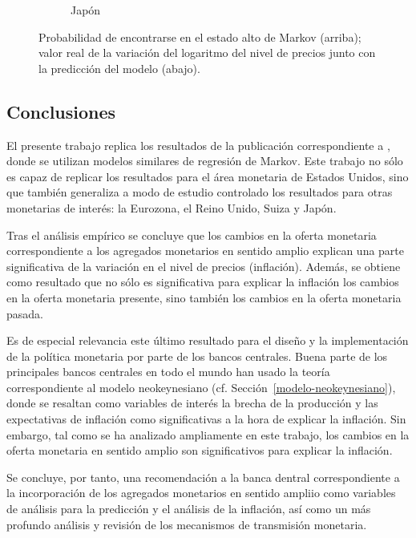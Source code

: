 \documentclass[titlepage, 12pt]{article}
\begin{document}
\begin{figure}
\begin{subfigure}[b]{0.49\textwidth}
        \caption{Japón}
    \end{subfigure}
    \caption{Probabilidad de encontrarse en el estado alto de Markov (arriba); valor real de la variación del logaritmo del nivel de precios junto con la predicción del modelo (abajo).}
    \label{fig:markov-cpi}
\end{figure}


\subsection{Conclusiones}
El presente trabajo replica los resultados de la publicación correspondiente a \cite{castaneda2023}, donde se utilizan modelos similares de regresión de Markov. Este trabajo no sólo es capaz de replicar los resultados para el área monetaria de Estados Unidos, sino que también generaliza a modo de estudio controlado los resultados para otras monetarias de interés: la Eurozona, el Reino Unido, Suiza y Japón.

Tras el análisis empírico se concluye que los cambios en la oferta monetaria correspondiente a los agregados monetarios en sentido amplio explican una parte significativa de la variación en el nivel de precios (inflación). Además, se obtiene como resultado que no sólo es significativa para explicar la inflación los cambios en la oferta monetaria presente, sino también los cambios en la oferta monetaria pasada.

Es de especial relevancia este último resultado para el diseño y la implementación de la política monetaria por parte de los bancos centrales. Buena parte de los principales bancos centrales en todo el mundo han usado la teoría correspondiente al modelo neokeynesiano (cf. Sección~\ref{modelo-neokeynesiano}), donde se resaltan como variables de interés la brecha de la producción y las expectativas de inflación como significativas a la hora de explicar la inflación. Sin embargo, tal como se ha analizado ampliamente en este trabajo, los cambios en la oferta monetaria en sentido amplio son significativos para explicar la inflación.

Se concluye, por tanto, una recomendación a la banca dentral correspondiente a la incorporación de los agregados monetarios en sentido ampliio como variables de análisis para la predicción y el análisis de la inflación, así como un más profundo análisis y revisión de los mecanismos de transmisión monetaria.

\nocite{*}
\newpage
\printbibliography

\newpage
\begin{appendices}
    
\end{appendices}
\end{document}
